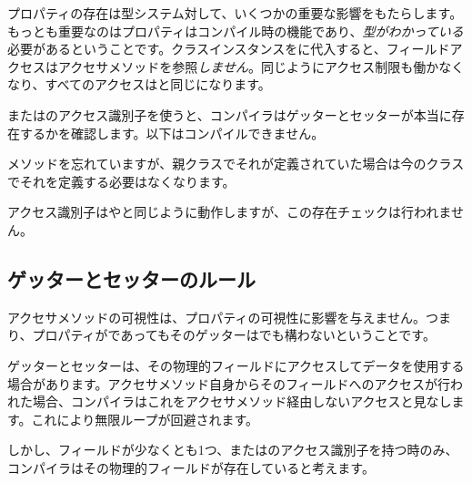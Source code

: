 プロパティの存在は型システム対して、いくつかの重要な影響をもたらします。もっとも重要なのはプロパティはコンパイル時の機能であり、\emph{型がわかっている}必要があるということです。クラスインスタンスをに代入すると、フィールドアクセスはアクセサメソッドを参照\emph{しません}。同じようにアクセス制限も働かなくなり、すべてのアクセスはと同じになります。

またはのアクセス識別子を使うと、コンパイラはゲッターとセッターが本当に存在するかを確認します。以下はコンパイルできません。


メソッドを忘れていますが、親クラスでそれが定義されていた場合は今のクラスでそれを定義する必要はなくなります。


アクセス識別子はやと同じように動作しますが、この存在チェックは行われません。

\subsection{ゲッターとセッターのルール}
\label{class-field-property-rules}

アクセサメソッドの可視性は、プロパティの可視性に影響を与えません。つまり、プロパティがであってもそのゲッターはでも構わないということです。

ゲッターとセッターは、その物理的フィールドにアクセスしてデータを使用する場合があります。アクセサメソッド自身からそのフィールドへのアクセスが行われた場合、コンパイラはこれをアクセサメソッド経由しないアクセスと見なします。これにより無限ループが回避されます。


しかし、フィールドが少なくとも1つ、またはのアクセス識別子を持つ時のみ、コンパイラはその物理的フィールドが存在していると考えます。


